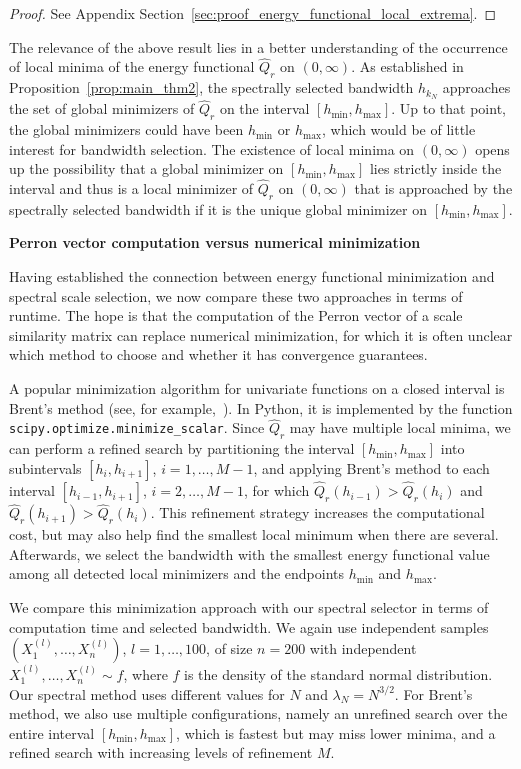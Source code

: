 \begin{proof}
    See Appendix Section~\ref{sec:proof_energy_functional_local_extrema}.
\end{proof}

The relevance of the above result lies in a better understanding of the occurrence of local minima of the energy functional $\hat{Q}_r$ on $(0,\infty)$. As established in Proposition~\ref{prop:main_thm2}, the spectrally selected bandwidth $h_{k_N}$ approaches the set of global minimizers of $\hat{Q}_r$ on the interval $[h_{\min},h_{\max}]$. Up to that point, the global minimizers could have been $h_{\min}$ or $h_{\max}$, which would be of little interest for bandwidth selection. The existence of local minima on $(0,\infty)$ opens up the possibility that a global minimizer on $[h_{\min},h_{\max}]$ lies strictly inside the interval and thus is a local minimizer of $\hat{Q}_r$ on $(0,\infty)$ that is approached by the spectrally selected bandwidth if it is the unique global minimizer on $[h_{\min},h_{\max}]$.

\textbf{Perron vector computation versus numerical minimization}

Having established the connection between energy functional minimization and spectral scale selection, we now compare these two approaches in terms of runtime. The hope is that the computation of the Perron vector of a scale similarity matrix can replace numerical minimization, for which it is often unclear which method to choose and whether it has convergence guarantees. 

A popular minimization algorithm for univariate functions on a closed interval is Brent's method (see, for example,~\cite[Section~10.2]{winkler_numerical_1993}). In Python, it is implemented by the function \texttt{scipy.optimize.minimize\_scalar}. Since $\hat{Q}_r$ may have multiple local minima, we can perform a refined search by partitioning the interval $[h_{\min},h_{\max}]$ into subintervals $[h_i,h_{i+1}]$, $i=1,\dots,M-1$, and applying Brent's method to each interval $[h_{i-1},h_{i+1}]$, $i=2,\dots,M-1$, for which $\hat{Q}_r(h_{i-1})>\hat{Q}_r(h_i)$ and $\hat{Q}_r(h_{i+1})>\hat{Q}_r(h_i)$. This refinement strategy increases the computational cost, but may also help find the smallest local minimum when there are several. Afterwards, we select the bandwidth with the smallest energy functional value among all detected local minimizers and the endpoints $h_{\min}$ and $h_{\max}$.

We compare this minimization approach with our spectral selector in terms of computation time and selected bandwidth. We again use independent samples $(X_1^{(l)},\allowbreak\dots,\allowbreak X_n^{(l)})$, $l=1,\dots,100$, of size $n=200$ with independent $X_1^{(l)},\dots,X_n^{(l)}\sim f$, where $f$ is the density of the standard normal distribution. Our spectral method uses different values for $N$ and $\lambda_N=N^{3/2}$. For Brent's method, we also use multiple configurations, namely an unrefined search over the entire interval $[h_{\min},h_{\max}]$, which is fastest but may miss lower minima, and a refined search with increasing levels of refinement $M$.

